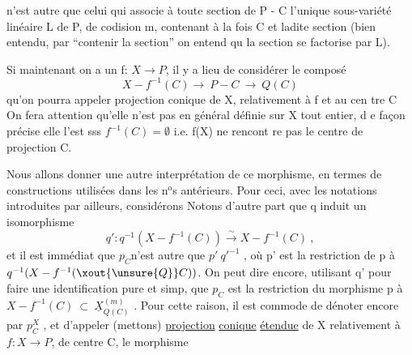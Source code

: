 
n'est autre que celui qui associe à toute section de  P - C  l'unique
sous-variété linéaire  L de P, de codision m, contenant à la fois C
et ladite section  (bien entendu, par ``contenir la section'' on entend qu
la section se factorise par L).

Si maintenant on a un f: $X \longrightarrow P$,  il y a lieu de considérer le
composé
\[ X - f^{-1}(C) \longrightarrow\ P - C \ \longrightarrow\ Q(C) \]
qu'on pourra appeler projection conique de X, relativement à f et au cen%
tre C\hand{,}  \hand{(}On fera attention qu'elle n'est pas en général définie sur X tout
entier, d e façon précise elle l'est sss $f^{-1}(C)=\emptyset$ i.e. f(X) ne rencont re
pas le centre de projection C. \hand{\unsure{)}}

Nous allons donner une autre interprétation de ce morphisme, en
termes de constructions utilisées dans les n$^{\text{o}}$s antérieurs.  Pour ceci,
avec les notations introduites par ailleurs, considérons
Notons d'autre part que  q  induit un  isomorphisme
\[ q':q^{-1}(X-f^{-1}(C)) \xrightarrow{\ \sim\ } X - f^{-1}(C) \ , \]
et il est immédiat que  $p_{C}$n'est autre  que   $p'\ q'^{-1}$ , où p' est la
restriction de  p à  $q^{-1}(X-f^{-1}(\xout{\unsure{Q}}C))$.  On peut dire encore, utilisant q'
pour faire une identification pure et simp, que  $p_{C}$ est la restriction
du morphisme p  à  $X - f^{-1}(C) \ \subset\ \underline{X}^{(m)}_{Q(C)}$ . Pour cette raison, il est
commode de dénoter encore par  $p^{X}_{C}$ , et d'appeler  (mettons)  \uline{projection}
\uline{conique}  \uline{étendue}  de X\hand{,} relativement à $f:X\rightarrow P$, de centre C, le morphisme

